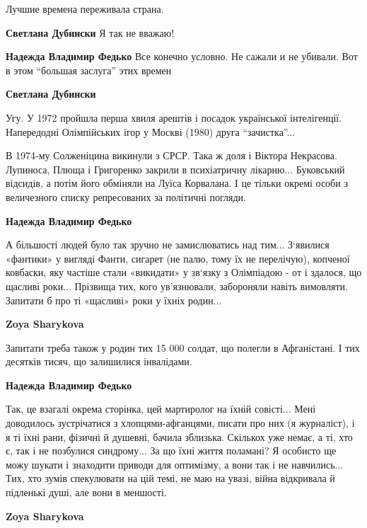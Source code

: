 \begin{itemize}
Лучшие времена переживала страна.

\begin{itemize} %
\textbf{Светлана Дубински} Я так не вважаю!

\begin{itemize} %
\textbf{Надежда Владимир Федько} Все конечно условно. Не сажали и не убивали. Вот в этом \enquote{большая заслуга} этих времен

\textbf{Светлана Дубински} 

Угу. У 1972 пройшла перша хвиля арештів і посадок української інтелігенції.
Напередодні Олімпійських ігор у Москві (1980) друга \enquote{зачистка}...

В 1974-му Солженіцина викинули з СРСР. Така ж доля і Віктора Некрасова.
Лупиноса, Плюща і Григоренко закрили в психіатричну лікарню... Буковський
відсидів, а потім його обміняли на Луїса Корвалана. І це тільки окремі особи з
величезного списку репресованих за політичні погляди.

\textbf{Надежда Владимир Федько} 

А більшості людей було так зручно не замислюватись над тим... З‘явилися «фантики»
у вигляді Фанти, сигарет (не палю, тому їх не перелічую), копченої ковбаски,
яку частіше стали «викидати» у зв‘язку з Олімпіадою - от і здалося, що щасливі
роки... Прізвища тих, кого ув’язнювали, забороняли навіть вимовляти. Запитати б
про ті «щасливі» роки у їхніх родин...


\textbf{Zoya Sharykova} 

Запитати треба також у родин тих 15 000 солдат, що полегли в Афганістані. І тих
десятків тисяч, що залишилися інвалідами.


\textbf{Надежда Владимир Федько} 

Так, це взагалі окрема сторінка, цей мартиролог на їхній совісті... Мені
доводилось зустрічатися з хлопцями-афганцями, писати про них (я журналіст), і я
ті їхні рани, фізичні й душевні, бачила зблизька. Скількох уже немає, а ті, хто
є, так і не позбулися синдрому... За що їхні життя поламані? Я особисто ще можу
шукати і знаходити приводи для оптимізму, а вони так і не навчились... Тих, хто
зумів спекулювати на цій темі, не маю на увазі, війна відкривала й підленькі
душі, але вони в меншості.

\textbf{Zoya Sharykova} 


\end{itemize}
\end{itemize}
\end{itemize}
